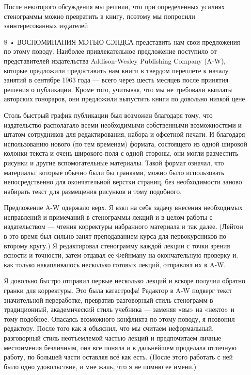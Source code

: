 \documentclass[10pt,oneside]{article}
\begin{document}
После некоторого обсуждения мы решили, что при определенных усилиях стенограммы можно превратить в книгу, поэтому мы попросили заинтересованных издателей\par

8 • ВОСПОМИНАНИЯ МЭТЬЮ СЭНДСА представить нам свои предложения по этому поводу. Наиболее привлекательное предложение поступило от представителей издательства Addison-Wesley Publishing Company (A-W), которые предложили предоставить нам книги в твердом переплете к началу занятий в сентябре 1963 года --- всего через шесть месяцев после принятия решения о публикации. Кроме того, учитывая, что мы не требовали выплаты авторских гонораров, они предложили выпустить книги по довольно низкой цене.\par

Столь быстрый график публикации был возможен благодаря тому, что издательство располагало всеми необходимыми собственными возможностями и штатом сотрудников для редактирования, набора и офсетной печати. И благодаря использованию нового (по тем временам) формата, состоящего из одной широкой колонки текста и очень широкого поля с одной стороны, они могли разместить рисунки и другие вспомогательные материалы. Такой формат означал, что материалы, которые обычно были бы гранками, можно было использовать непосредственно для окончательной верстки страниц, без необходимости заново набирать текст для размещения рисунков и тому подобного.\par

Предложение A-W одержало верх. Я взял на себя задачу внесения необходимых исправлений и примечаний в стенограммы лекций и в целом работы с издательством --- чтения корректуры набранного материала и так далее. (Лейтон в это время был сильно занят преподаванием курса для первокурсников по второму кругу.) Я редактировал стенограмму каждой лекции с точки зрения ясности и точности, затем отдавал ее Фейнману на окончательную проверку и, как только накапливалось несколько готовых лекций, отправлял их в A-W.\par

Я довольно быстро отправил первые несколько лекций и вскоре получил обратно гранки для корректуры. Это была катастрофа! Редактор в A-W подверг текст значительной переработке, превратив разговорный стиль стенограмм в традиционный, академический стиль учебника --- заменяя «вы» на «некто» и тому подобное. Опасаясь возможного конфликта по этому поводу, я позвонил редактору. После того как я объяснил, что мы считаем неформальный, разговорный стиль неотъемлемой частью лекций и предпочитаем личные местоимения безличным, она все поняла и в дальнейшем проделала отличную работу, по большей части оставляя всё как есть. (После этого работать с ней было одно удовольствие, и мне жаль, что я не помню ее имени.)\par
\end{document}
